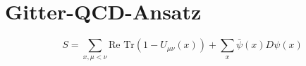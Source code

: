 \section{Gitter-QCD-Ansatz}
\[
S = \sum_{x,\mu<\nu} \text{Re Tr}(1 - U_{\mu\nu}(x)) + \sum_x \bar{\psi}(x) D \psi(x)
\]